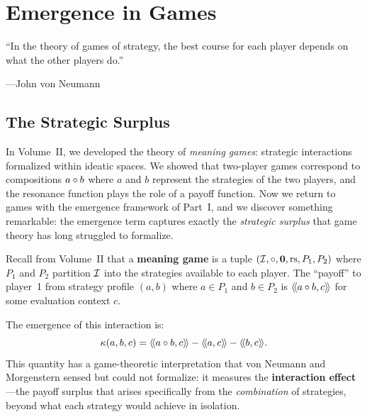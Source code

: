 %


\chapter{Emergence in Games}
\label{ch:emergence-games}

\epigraph{``In the theory of games of strategy, the best course for each player
depends on what the other players do.''}
{---John von Neumann}


\section{The Strategic Surplus}

In Volume~II, we developed the theory of \emph{meaning games}: strategic
interactions formalized within ideatic spaces. We showed that two-player games
correspond to compositions $a \circ b$ where $a$ and $b$ represent the
strategies of the two players, and the resonance function plays the role of
a payoff function. Now we return to games with the emergence framework of
Part~I, and we discover something remarkable: the emergence term captures
exactly the \emph{strategic surplus} that game theory has long struggled to
formalize.

Recall from Volume~II that a \textbf{meaning game} is a tuple
$(\mathcal{I}, \circ, \mathbf{0}, \mathrm{rs}, P_1, P_2)$ where $P_1$ and $P_2$ partition
$\mathcal{I}$ into the strategies available to each player. The ``payoff'' to player~1
from strategy profile $(a, b)$ where $a \in P_1$ and $b \in P_2$ is
$\langle\!\langle a \circ b, c \rangle\!\rangle$ for some evaluation context $c$.

The emergence of this interaction is:
\[
  \kappa(a, b, c) = \langle\!\langle a \circ b, c \rangle\!\rangle - \langle\!\langle a, c \rangle\!\rangle - \langle\!\langle b, c \rangle\!\rangle.
\]
This quantity has a game-theoretic interpretation that von Neumann and Morgenstern
sensed but could not formalize: it measures the \textbf{interaction effect}---the
payoff surplus that arises specifically from the \emph{combination} of strategies,
beyond what each strategy would achieve in isolation.

